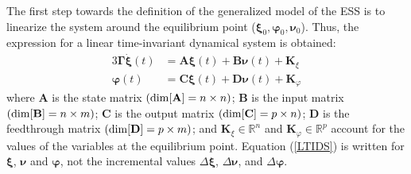 \documentclass[journal, a4paper]{IEEEtran}
\newcommand{\bfg}[1]{\boldsymbol{#1}}
\begin{document}
The first step towards the definition of the generalized model of the
ESS is to linearize the system around the equilibrium point
($\boldsymbol{\xi}_0, \boldsymbol{\varphi}_0,
\boldsymbol{\nu}_0$). Thus, the expression for a linear time-invariant
dynamical system is obtained:
\begin{alignat}{3}
  \nonumber \boldsymbol{\Gamma} \dot{\boldsymbol{\xi}}(t) &= 
  \mathbf{A} \boldsymbol{\xi}(t) + \mathbf{B} \boldsymbol{\nu}(t) + \mathbf{K}_{\xi}\\
  \boldsymbol{\varphi}(t) &= \mathbf{C} \boldsymbol{\xi}(t) +
  \mathbf{D} \boldsymbol{\nu}(t) + \mathbf{K}_{\varphi}
  \label{LTIDS}
\end{alignat}
where $\mathbf{A}$ is the state matrix $\left( {\rm dim}[\mathbf{A}] =
  n \times n \right)$; $\mathbf{B}$ is the input matrix $\left( {\rm
    dim}[\mathbf{B}] = n \times m \right)$; $\mathbf{C}$ is the output
matrix $\left( {\rm dim}[\mathbf{C}] = p \times n \right)$;
$\mathbf{D}$ is the feedthrough matrix $\left( {\rm dim}[\mathbf{D}] =
  p \times m \right)$; and $\mathbf{K}_{\xi} \in \mathbb{R}^n$ and
$\mathbf{K}_{\varphi} \in \mathbb{R}^p$ account for the values of the
variables at the equilibrium point.  Equation (\ref{LTIDS}) is written
for $\bfg \xi$, $\bfg \nu$ and $\bfg \varphi$, not the incremental
values $\Delta \bfg \xi$, $\Delta \bfg \nu$, and $\Delta \bfg
\varphi$.
\end{document}
